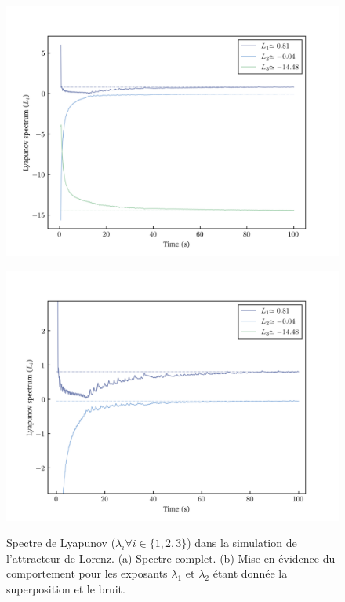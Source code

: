     \begin{figure}[h!]
        \centering
        \begin{minipage}{0.49\textwidth}
          \centering
          \includegraphics[scale = 0.4]{figs/lyapunovs/lyap_lorenz.png}
          \subcaption{}
          \label{fig: lyap_lorenz}
        \end{minipage}
        \begin{minipage}{0.49\textwidth}
          \centering
          \includegraphics[scale = 0.4]{figs/lyapunovs/lyap_lorenz_zoom.png}
          \subcaption{}
          \label{fig: lyap_lorenz_zoom}
        \end{minipage}
        \caption{Spectre de Lyapunov ($\lambda_i\forall i\in\{1, 2, 3\}$) dans
        la simulation de l'attracteur de Lorenz. (a) Spectre complet. (b) Mise
    en évidence du comportement pour les exposants $\lambda_1$ et $\lambda_2$
étant donnée la superposition et le bruit.}
        \label{fig : lyaps_lorenz}
    \end{figure}

